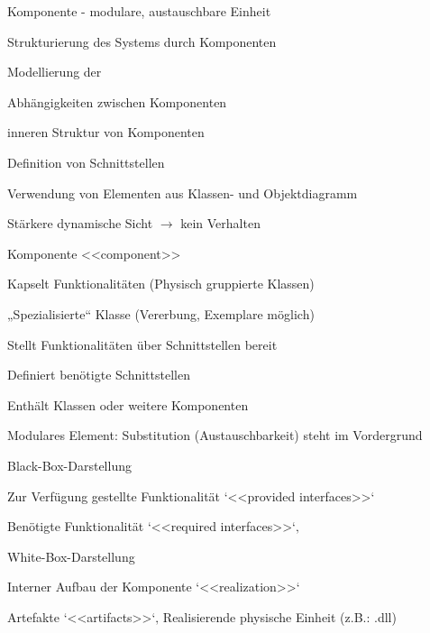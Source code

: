 \documentclass[a4paper]{article}
\begin{document}
\begin{multicols}{3}
\begin{itemize*}
\begin{itemize*}
      \item Komponente - modulare, austauschbare Einheit
      \item Strukturierung des Systems durch Komponenten
      \item Modellierung der
      \begin{itemize*}
        \item Abhängigkeiten zwischen Komponenten
        \item inneren Struktur von Komponenten
      \end{itemize*}
      \item Definition von Schnittstellen
      \item Verwendung von Elementen aus Klassen- und Objektdiagramm
      \item Stärkere dynamische Sicht $\rightarrow$ kein Verhalten
      \item Komponente <<component>>
      \begin{itemize*}
        \item Kapselt Funktionalitäten (Physisch gruppierte Klassen)
        \item „Spezialisierte“ Klasse (Vererbung, Exemplare möglich)
        \item Stellt Funktionalitäten über Schnittstellen bereit
        \item Definiert benötigte Schnittstellen
        \item Enthält Klassen oder weitere Komponenten
        \item Modulares Element: Substitution (Austauschbarkeit) steht im Vordergrund
      \end{itemize*}
      \item Black-Box-Darstellung
      \begin{itemize*}
        \item Zur Verfügung gestellte Funktionalität `<<provided interfaces>>`
        \item Benötigte Funktionalität `<<required interfaces>>`‚
      \end{itemize*}
      \item White-Box-Darstellung
      \begin{itemize*}
        \item Interner Aufbau der Komponente `<<realization>>`
        \item Artefakte `<<artifacts>>`‚ Realisierende physische Einheit (z.B.: .dll)
      \end{itemize*}
    \end{itemize*}
  \end{itemize*}


\end{multicols}
\end{document}
